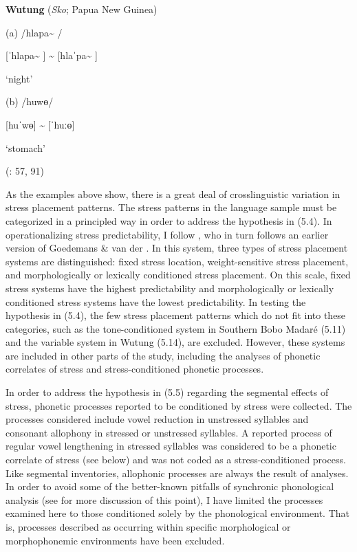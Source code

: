 \ea\label{ex:(5.14)}
  \textbf{Wutung} (\textit{Sko}; Papua New Guinea)



(a)  /hlapa\~{} /



[ˈhlapa\~{} ] {\textasciitilde} [hlaˈpa\~{} ]



‘night’



(b)  /huwɵ/



[huˈwɵ] {\textasciitilde} [ˈhuːɵ]



‘stomach’



(\citealt{Marmion2010}: 57, 91)
\z



  As the examples above show, there is a great deal of crosslinguistic variation in stress placement patterns. The stress patterns in the language sample must be categorized in a principled way in order to address the hypothesis in (5.4). In operationalizing stress predictability, I follow \citet{Schiering2007}, who in turn follows an earlier version of Goedemans \& van der \citet{Hulst2013a}. In this system, three types of stress placement systems are distinguished: fixed stress location, weight-sensitive stress placement, and morphologically or lexically conditioned stress placement. On this scale, fixed stress systems have the highest predictability and morphologically or lexically conditioned stress systems have the lowest predictability. In testing the hypothesis in (5.4), the few stress placement patterns which do not fit into these categories, such as the tone-conditioned system in Southern Bobo Madaré (5.11) and the variable system in Wutung (5.14), are excluded. However, these systems are included in other parts of the study, including the analyses of phonetic correlates of stress and stress-conditioned phonetic processes.



  In order to address the hypothesis in (5.5) regarding the segmental effects of stress, phonetic processes reported to be conditioned by stress were collected. The processes considered include vowel reduction in unstressed syllables and consonant allophony in stressed or unstressed syllables. A reported process of regular vowel lengthening in stressed syllables was considered to be a phonetic correlate of stress (see below) and was not coded as a stress-conditioned process. Like segmental inventories, allophonic processes are always the result of analyses. In order to avoid some of the better-known pitfalls of synchronic phonological analysis (see  for more discussion of this point), I have limited the processes examined here to those conditioned solely by the phonological environment. That is, processes described as occurring within specific morphological or morphophonemic environments have been excluded.



